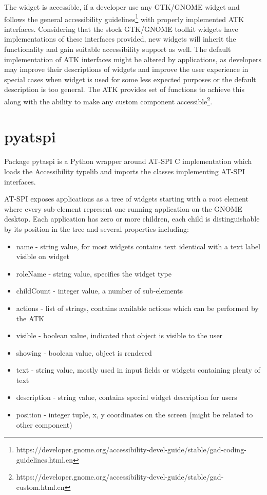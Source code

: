 The widget is accessible, if a developer use any GTK/GNOME widget and follows the general accessibility guidelines\footnote{https://developer.gnome.org/accessibility-devel-guide/stable/gad-coding-guidelines.html.en} with properly implemented ATK interfaces. Considering that the stock GTK/GNOME toolkit widgets have implementations of these interfaces provided, new widgets will inherit the functionality and gain suitable accessibility support as well. The default implementation of ATK interfaces might be altered by applications, as developers may improve their descriptions of widgets and improve the user experience in special cases when widget is used for some less expected purposes or the default description is too general. The ATK provides set of functions to achieve this along with the ability to make any custom component accessible\footnote{https://developer.gnome.org/accessibility-devel-guide/stable/gad-custom.html.en}.\cite{accessibleWidgets}

\newpage
\section{pyatspi}
Package pytaspi is a Python wrapper around AT-SPI C implementation which loads the Accessibility typelib and imports the classes implementing AT-SPI interfaces.\cite{pyatspi}

AT-SPI exposes applications as a tree of widgets starting with a root element where every sub-element represent one running application on the GNOME desktop. Each application has zero or more children, each child is distinguishable by its position in the tree and several properties including:
\begin{itemize}
    \item name - string value, for most widgets contains text identical with a text label visible on widget
    \item roleName - string value, specifies the widget type
    \item childCount - integer value, a number of sub-elements 
    \item actions - list of strings, contains available actions which can be performed by the ATK
    \item visible - boolean value, indicated that object is visible to the user
    \item showing - boolean value, object is rendered
    \item text - string value, mostly used in input fields or widgets containing plenty of text
    \item description - string value, contains special widget description for users
    \item position - integer tuple, x, y coordinates on the screen (might be related to other component)
\end{itemize}

